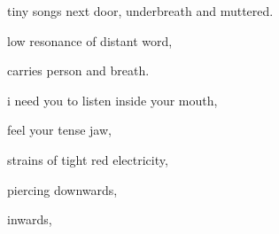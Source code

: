 \documentclass[extrafontsizes, 48pt]{memoir}
\newcommand\blankpage{%
    \null
    \thispagestyle{empty}%
    \addtocounter{page}{-1}%
    \newpage}
\begin{document}
	\begin{minipage}{.6\textwidth}
	tiny songs next door, underbreath and muttered.
	\end{minipage}
	\newpage

	\begin{minipage}{.6\textwidth}
	low resonance of distant word,
	\end{minipage}
	\newpage

	\begin{minipage}{.6\textwidth}
	carries person and breath.
	\afterpage{\blankpage}
	\end{minipage}
	\newpage

	\begin{minipage}{.6\textwidth}
	i need you to listen inside your mouth,
	\end{minipage}
	\newpage

	\begin{minipage}{.6\textwidth}
	feel your tense jaw, 
	\end{minipage}
	\newpage

	\begin{minipage}{.6\textwidth}
	strains of tight red electricity,
	\end{minipage}
	\newpage

	\begin{minipage}{.6\textwidth}
	piercing downwards,
	\end{minipage}
	\newpage

	\begin{minipage}{.6\textwidth}
	inwards,
	\end{minipage}
	\newpage
\end{document}
